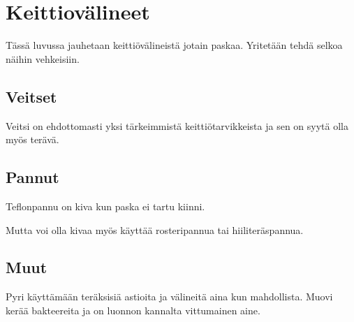 \documentclass[../keittiokirja.tex]{subfiles}
\begin{document}
\section{Keittiovälineet}
\label{sec:keittiovalineet}

Tässä luvussa jauhetaan keittiövälineistä jotain paskaa. Yritetään tehdä selkoa näihin vehkeisiin.

\subsection{Veitset}

Veitsi on ehdottomasti yksi tärkeimmistä keittiötarvikkeista ja sen on syytä olla myös terävä.

\subsection{Pannut}

Teflonpannu on kiva kun paska ei tartu kiinni.

Mutta voi olla kivaa myös käyttää rosteripannua tai hiiliteräspannua.

\subsection{Muut}

Pyri käyttämään teräksisiä astioita ja välineitä aina kun mahdollista. Muovi kerää bakteereita 
ja on luonnon kannalta vittumainen aine.

\blindtext


\blindtext

\blindtext


\blindtext


\blindtext
\end{document}
